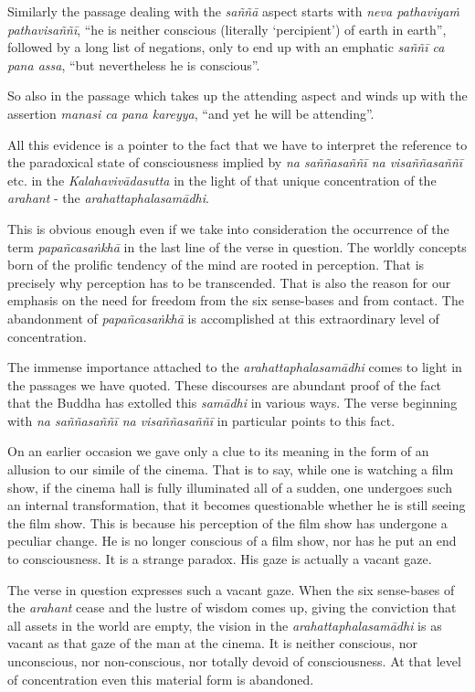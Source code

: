 Similarly the passage dealing with the \emph{saññā} aspect starts with \emph{neva pathaviyaṁ pathavisaññī}, ``he is neither conscious (literally `percipient') of earth in earth'', followed by a long list of negations, only to end up with an emphatic \emph{saññī ca pana assa}, ``but nevertheless he is conscious''.

So also in the passage which takes up the attending aspect and winds up with the assertion \emph{manasi ca pana kareyya}, ``and yet he will be attending''.

All this evidence is a pointer to the fact that we have to interpret the reference to the paradoxical state of consciousness implied by \emph{na saññasaññī na visaññasaññī} etc. in the \emph{Kalahavivādasutta} in the light of that unique concentration of the \emph{arahant} - the \emph{arahattaphalasamādhi}.

This is obvious enough even if we take into consideration the occurrence of the term \emph{papañcasaṅkhā} in the last line of the verse in question. The worldly concepts born of the prolific tendency of the mind are rooted in perception. That is precisely why perception has to be transcended. That is also the reason for our emphasis on the need for freedom from the six sense-bases and from contact. The abandonment of \emph{papañcasaṅkhā} is accomplished at this extraordinary level of concentration.

The immense importance attached to the \emph{arahattaphalasamādhi} comes to light in the passages we have quoted. These discourses are abundant proof of the fact that the Buddha has extolled this \emph{samādhi} in various ways. The verse beginning with \emph{na saññasaññī na visaññasaññī} in particular points to this fact.

On an earlier occasion we gave only a clue to its meaning in the form of an allusion to our simile of the cinema. That is to say, while one is watching a film show, if the cinema hall is fully illuminated all of a sudden, one undergoes such an internal transformation, that it becomes questionable whether he is still seeing the film show. This is because his perception of the film show has undergone a peculiar change. He is no longer conscious of a film show, nor has he put an end to consciousness. It is a strange paradox. His gaze is actually a vacant gaze.

The verse in question expresses such a vacant gaze. When the six sense-bases of the \emph{arahant} cease and the lustre of wisdom comes up, giving the conviction that all assets in the world are empty, the vision in the \emph{arahattaphalasamādhi} is as vacant as that gaze of the man at the cinema. It is neither conscious, nor unconscious, nor non-conscious, nor totally devoid of consciousness. At that level of concentration even this material form is abandoned.


